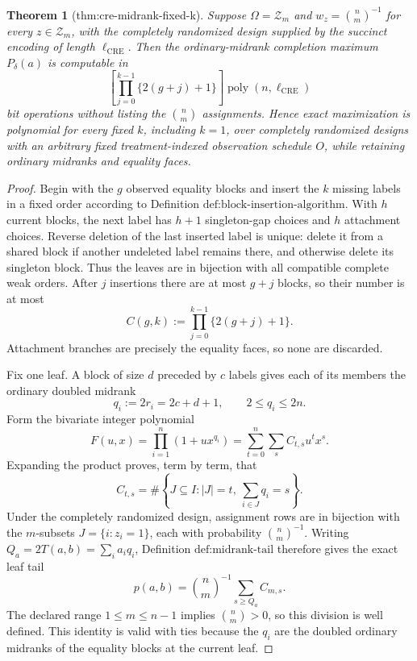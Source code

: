 \documentclass{article}
\newtheorem{theorem}{Theorem}
\begin{document}
\begin{theorem}[thm:cre-midrank-fixed-k]\label{thm:cre-midrank-fixed-k}
Suppose \(\Omega=\mathcal Z_m\) and
\(w_z=\binom{n}{m}^{-1}\) for every \(z\in\mathcal Z_m\), with the completely
randomized design supplied by the succinct encoding of length
\(\ell_{\mathrm{CRE}}\).  Then the ordinary-midrank completion maximum
\(P_\delta(a)\) is computable in
\[
 \left[\prod_{j=0}^{k-1}\{2(g+j)+1\}\right]
 \operatorname{poly}(n,\ell_{\mathrm{CRE}})
\]
bit operations without listing the \(\binom{n}{m}\) assignments.  Hence exact
maximization is polynomial for every fixed \(k\), including \(k=1\), over
completely randomized designs with an arbitrary fixed treatment-indexed
observation schedule \(O\), while retaining ordinary midranks and equality
faces.
\end{theorem}
\begin{proof}
Begin with the \(g\) observed equality blocks and insert the \(k\) missing
labels in a fixed order according to
Definition \(\text{def:block-insertion-algorithm}\).  With \(h\) current
blocks, the next label has \(h+1\) singleton-gap choices and \(h\) attachment
choices.  Reverse deletion of the last inserted label is unique: delete it
from a shared block if another undeleted label remains there, and otherwise
delete its singleton block.  Thus the leaves are in bijection with all
compatible complete weak orders.  After \(j\) insertions there are at most
\(g+j\) blocks, so their number is at most
\[
 C(g,k):=\prod_{j=0}^{k-1}\{2(g+j)+1\}.
\]
Attachment branches are precisely the equality faces, so none are discarded.

Fix one leaf.  A block of size \(d\) preceded by \(c\) labels gives each of its
members the ordinary doubled midrank
\[
 q_i:=2r_i=2c+d+1,
 \qquad 2\le q_i\le2n.
\]
Form the bivariate integer polynomial
\[
 F(u,x)=\prod_{i=1}^n(1+u x^{q_i})
       =\sum_{t=0}^n\sum_s C_{t,s}u^t x^s.
\]
Expanding the product proves, term by term, that
\[
 C_{t,s}
 =\#\left\{J\subseteq I:|J|=t,
                    \ \sum_{i\in J}q_i=s\right\}.
\]
Under the completely randomized design, assignment rows are in bijection with
the \(m\)-subsets \(J=\{i:z_i=1\}\), each with probability
\(\binom{n}{m}^{-1}\).  Writing \(Q_a=2T(a,b)=\sum_i a_iq_i\), Definition
\(\text{def:midrank-tail}\) therefore gives the exact leaf tail
\[
 p(a,b)=\binom{n}{m}^{-1}\sum_{s\ge Q_a}C_{m,s}.
\]
The declared range \(1\le m\le n-1\) implies \(\binom{n}{m}>0\), so this
division is well defined.
This identity is valid with ties because the \(q_i\) are the doubled ordinary
midranks of the equality blocks at the current leaf.


\end{proof}
\end{document}
